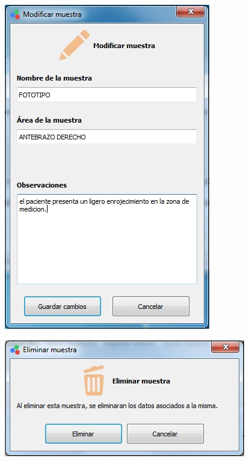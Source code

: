 \begin{figure}[H]
\centering
\begin{minipage}{.5\textwidth}
  \centering
  \includegraphics[width=.9\linewidth]{./img/modificar-muestra.jpg}
  \label{fig:test1}
\end{minipage}%
\begin{minipage}{.5\textwidth}
  \centering
  \includegraphics[width=1\linewidth]{./img/eliminar-muestra.jpg}
  \label{fig:test2}
\end{minipage}
\end{figure}

